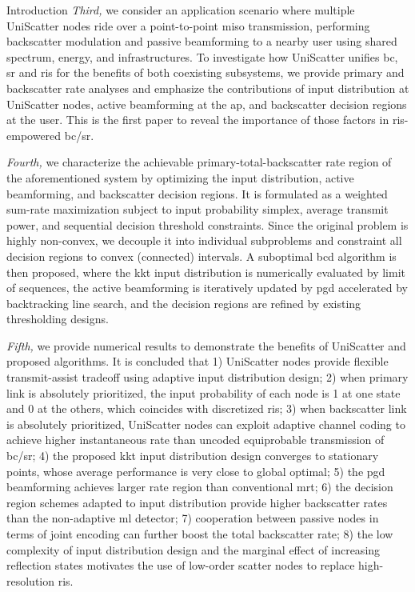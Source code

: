 \documentclass[journal]{IEEEtran}
\begin{document}
\begin{section}{Introduction}
	\emph{Third,} we consider an application scenario where multiple UniScatter nodes ride over a point-to-point \gls{miso} transmission, performing backscatter modulation and passive beamforming to a nearby user using shared spectrum, energy, and infrastructures.
	To investigate how UniScatter unifies \gls{bc}, \gls{sr} and \gls{ris} for the benefits of both coexisting subsystems, we provide primary and backscatter rate analyses and emphasize the contributions of input distribution at UniScatter nodes, active beamforming at the \gls{ap}, and backscatter decision regions at the user.
	This is the first paper to reveal the importance of those factors in \gls{ris}-empowered \gls{bc}/\gls{sr}.

	\emph{Fourth,} we characterize the achievable primary-total-backscatter rate region of the aforementioned system by optimizing the input distribution, active beamforming, and backscatter decision regions.
	It is formulated as a weighted sum-rate maximization subject to input probability simplex, average transmit power, and sequential decision threshold constraints.
	Since the original problem is highly non-convex, we decouple it into individual subproblems and constraint all decision regions to convex (connected) intervals.
	A suboptimal \gls{bcd} algorithm is then proposed, where the \gls{kkt} input distribution is numerically evaluated by limit of sequences, the active beamforming is iteratively updated by \gls{pgd} accelerated by backtracking line search, and the decision regions are refined by existing thresholding designs.

	\emph{Fifth,} we provide numerical results to demonstrate the benefits of UniScatter and proposed algorithms.
	It is concluded that 1) UniScatter nodes provide flexible transmit-assist tradeoff using adaptive input distribution design; 2) when primary link is absolutely prioritized, the input probability of each node is \num{1} at one state and \num{0} at the others, which coincides with discretized \gls{ris}; 3) when backscatter link is absolutely prioritized, UniScatter nodes can exploit adaptive channel coding to achieve higher instantaneous rate than uncoded equiprobable transmission of \gls{bc}/\gls{sr}; 4) the proposed \gls{kkt} input distribution design converges to stationary points, whose average performance is very close to global optimal; 5) the \gls{pgd} beamforming achieves larger rate region than conventional \gls{mrt}; 6) the decision region schemes adapted to input distribution provide higher backscatter rates than the non-adaptive \gls{ml} detector; 7) cooperation between passive nodes in terms of joint encoding can further boost the total backscatter rate; 8) the low complexity of input distribution design and the marginal effect of increasing reflection states motivates the use of low-order scatter nodes to replace high-resolution \gls{ris}.


\end{section}
\end{document}
